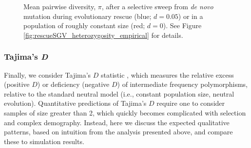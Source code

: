 \documentclass[]{article}
\begin{document}
\begin{figure}[htb]
\caption{
Mean pairwise diversity, $\pi$, after a selective sweep from \textit{de novo} mutation during evolutionary rescue (blue; $d=0.05$) or in a population of roughly constant size (red; $d=0$).
See Figure \ref{fig:rescueSGV_heterozygosity_empirical} for details.
}%
\label{fig:rescueDNM_heterozygosity_empirical}
\end{figure}

\subsubsection*{Tajima's \textit{D}}
\label{sec:tajimasD}

Finally, we consider Tajima's $D$ statistic \citep{tajima1989statistical}, which measures the relative excess (positive $D$) or deficiency (negative $D$) of intermediate frequency polymorphisms, relative to the standard neutral model (i.e., constant population size, neutral evolution). 
Quantitative predictions of Tajima's $D$ require one to consider samples of size greater than 2, which quickly becomes complicated with selection and complex demography.
Instead, here we discuss the expected qualitative patterns, based on intuition from the analysis presented above, and compare these to simulation results.
\end{document}

